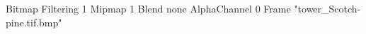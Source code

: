 {Bitmap
	{Filtering 1}
	{Mipmap 1}
	{Blend none}
	{AlphaChannel 0}
	{Frame "tower_Scotch-pine.tif.bmp"}
}
